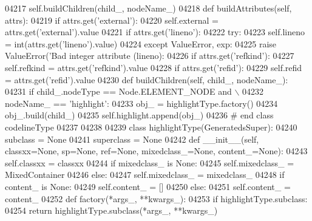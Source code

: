 \begin{DoxyCode}
{{{{{{{{{{{{{{{{{{{{{{{{{{{{{{{{{{{{{{{{{{{{{{{{{{{{{{{{{{{{{{{{{{{{{{{{{{{{{{{{{{{{{{{{{{{{{{{{{{{{{{{{{{{{{{{{{{{{{{{{{{{{{{{{{{{{{{{{{{{{{{{{{{{{{{{{{{{{{{{{{{{{{{{{{{{{{{{{{{{{{{{{{{{{{{{{{{{{{{{{{{{{{{{{{{{{{{{{{{{{{{{{{{{{{{{{{{{{{{{{{{{{{{{{{{{{{{{{{{{{{{{{{{{{{{{{{{{{{04217             self.buildChildren(child\_, nodeName\_)
04218     \textcolor{keyword}{def }buildAttributes(self, attrs):
04219         \textcolor{keywordflow}{if} attrs.get(\textcolor{stringliteral}{'external'}):
04220             self.external = attrs.get(\textcolor{stringliteral}{'external'}).value
04221         \textcolor{keywordflow}{if} attrs.get(\textcolor{stringliteral}{'lineno'}):
04222             \textcolor{keywordflow}{try}:
04223                 self.lineno = int(attrs.get(\textcolor{stringliteral}{'lineno'}).value)
04224             \textcolor{keywordflow}{except} ValueError, exp:
04225                 \textcolor{keywordflow}{raise} ValueError(\textcolor{stringliteral}{'Bad integer attribute (lineno): %
04226         \textcolor{keywordflow}{if} attrs.get(\textcolor{stringliteral}{'refkind'}):
04227             self.refkind = attrs.get(\textcolor{stringliteral}{'refkind'}).value
04228         \textcolor{keywordflow}{if} attrs.get(\textcolor{stringliteral}{'refid'}):
04229             self.refid = attrs.get(\textcolor{stringliteral}{'refid'}).value
04230     \textcolor{keyword}{def }buildChildren(self, child\_, nodeName\_):
04231         \textcolor{keywordflow}{if} child\_.nodeType == Node.ELEMENT\_NODE \textcolor{keywordflow}{and} \(\backslash\)
04232             nodeName\_ == \textcolor{stringliteral}{'highlight'}:
04233             obj\_ = highlightType.factory()
04234             obj\_.build(child\_)
04235             self.highlight.append(obj\_)
04236 \textcolor{comment}{# end class codelineType}
04237 
04238 
04239 \textcolor{keyword}{class }highlightType(GeneratedsSuper):
04240     subclass = \textcolor{keywordtype}{None}
04241     superclass = \textcolor{keywordtype}{None}
04242     \textcolor{keyword}{def }__init__(self, classxx=None, sp=None, ref=None, mixedclass\_=None, content\_=None):
04243         self.classxx = classxx
04244         \textcolor{keywordflow}{if} mixedclass\_ \textcolor{keywordflow}{is} \textcolor{keywordtype}{None}:
04245             self.mixedclass_ = MixedContainer
04246         \textcolor{keywordflow}{else}:
04247             self.mixedclass_ = mixedclass\_
04248         \textcolor{keywordflow}{if} content\_ \textcolor{keywordflow}{is} \textcolor{keywordtype}{None}:
04249             self.content_ = []
04250         \textcolor{keywordflow}{else}:
04251             self.content_ = content\_
04252     \textcolor{keyword}{def }factory(*args\_, **kwargs\_):
04253         \textcolor{keywordflow}{if} highlightType.subclass:
04254             \textcolor{keywordflow}{return} highlightType.subclass(*args\_, **kwargs\_)
}}}}}}}}}}}}}}}}}}}}}}}}}}}}}}}}}}}}}}}}}}}}}}}}}}}}}}}}}}}}}}}}}}}}}}}}}}}}}}}}}}}}}}}}}}}}}}}}}}}}}}}}}}}}}}}}}}}}}}}}}}}}}}}}}}}}}}}}}}}}}}}}}}}}}}}}}}}}}}}}}}}}}}}}}}}}}}}}}}}}}}}}}}}}}}}}}}}}}}}}}}}}}}}}}}}}}}}}}}}}}}}}}}}}}}}}}}}}}}}}}}}}}}}}}}}}}}}}}}}}}}}}}}}}}}}}}}}}}}
\end{DoxyCode}
